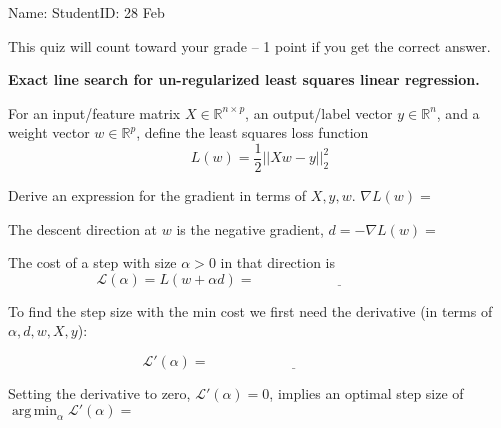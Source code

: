 \documentclass[12pt]{article}
\DeclareMathOperator*{\argmin}{arg\,min}
\begin{document}
\thispagestyle{empty}

Name: \underline{\hspace{2in}} StudentID: \underline{\hspace{2in}} 28 Feb

This quiz will count toward your grade -- 1 point if you get the
correct answer.

\textbf{Exact line search for un-regularized least squares linear regression. }

For an input/feature matrix $X\in \mathbb R^{n\times p}$, an
output/label vector $y\in\mathbb R^n$, and a weight vector
$w\in\mathbb R^p$, define the least squares loss function
$$ L(w) = \frac 1 2|| Xw - y||^2_2$$

\vskip 1in Derive an expression for the gradient in terms of $X,y,w$.
$\nabla L(w)=$\underline{\hspace{2in}}

\vskip 1in
The descent direction at $w$ is the negative gradient,
$ d = -\nabla L(w)=$\underline{\hspace{2in}}

The cost of a step with size $\alpha>0$ in that direction is
\vskip 1in
\begin{equation*}
  \mathcal L(\alpha) = L(w + \alpha d) = \underline{\hspace{2in}}
\end{equation*}

To find the step size with the min cost we first need the derivative
(in terms of $\alpha,d,w,X,y$):

\vskip 1in
\begin{equation*}
  \mathcal L'(\alpha) = \underline{\hspace{2in}}
\end{equation*}

Setting the derivative to zero, $\mathcal L'(\alpha)=0$,  implies an optimal step size of
\vskip 1in
$\argmin_\alpha \mathcal
L'(\alpha)=$\underline{\hspace{2in}}
\end{document}
